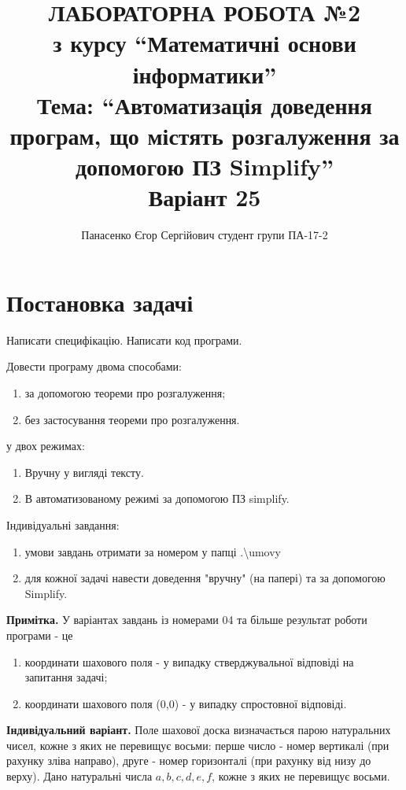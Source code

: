 \documentclass[14pt,a4paper]{extarticle}
\title{%
  \uppercase{\textbf{Лабораторна робота №2}}\\
  \large з курсу ``Математичні основи інформатики''\\
  Тема: ``Автоматизація доведення програм, що містять розгалуження за
    допомогою ПЗ Simplify''\\
  Варіант 25}
\author{Панасенко Єгор Сергійович \newline студент групи ПА-17-2}
\date{}
\theoremstyle{definition}
\begin{document}
\sloppy %
\allowdisplaybreaks %

\maketitle
\thispagestyle{empty}

\section{Постановка задачі}

Написати специфікацію. Написати код програми.

Довести програму двома способами:
\begin{enumerate}
  \item за допомогою теореми про розгалуження;
  \item без застосування теореми про розгалуження.
\end{enumerate}

у двох режимах:
\begin{enumerate}
  \item Вручну у вигляді тексту.
  \item В автоматизованому режимі за допомогою ПЗ simplify.
\end{enumerate}

Індивідуальні завдання:
\begin{enumerate}
  \item умови завдань отримати за номером у папці .\textbackslash{}umovy
  \item для кожної задачі навести доведення "вручну" (на папері) та за
допомогою Simplify.
\end{enumerate}

\textbf{Примітка.} У варіантах завдань із номерами 04 та більше
результат роботи програми - це
\begin{enumerate}
  \item координати шахового поля - у випадку стверджувальної відповіді на
  запитання задачі;

  \item координати шахового поля (0,0) - у випадку спростовної відповіді.
\end{enumerate}

\textbf{Індивідуальний варіант.}
Поле шахової доска визначається парою натуральних чисел,
кожне з яких не перевищує восьми:
перше число - номер вертикалі (при рахунку зліва направо),
друге - номер горизонталі (при рахунку від низу до верху).
Дано натуральні числа $ a, b, c, d, e, f $, кожне з яких не перевищує восьми.
\end{document}
